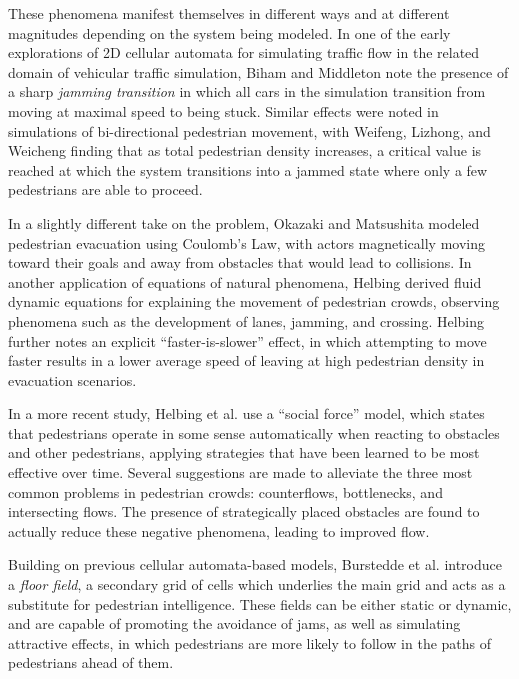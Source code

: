 \documentclass[12pt]{article}
\begin{document}
These phenomena manifest themselves in different ways and at different
magnitudes depending on the system being modeled. In one of the early
explorations of 2D cellular automata for simulating traffic flow in the related
domain of vehicular traffic simulation, Biham and Middleton \cite{biham1992self}
note the presence of a sharp
\textit{jamming transition} in which all cars in the simulation transition from
moving at maximal speed to being stuck. Similar effects were noted in
simulations of bi-directional pedestrian movement, with Weifeng, Lizhong, and
Weicheng \cite{weifeng2003simulation} finding that as total pedestrian density
increases, a critical value is reached at which the system transitions into a
jammed state where only a few pedestrians are able to proceed.

In a slightly different take on the problem, Okazaki and Matsushita
\cite{okazaki1993study} modeled pedestrian evacuation using Coulomb's Law, with
actors magnetically moving toward their goals and away from obstacles that would
lead to collisions. In another application of equations of natural phenomena,
Helbing \cite{helbing1998fluid} derived fluid dynamic equations for explaining
the movement of pedestrian crowds, observing phenomena such as the development
of lanes, jamming, and crossing. Helbing \cite{helbing2000simulating} further
notes an explicit ``faster-is-slower'' effect, in which attempting to move faster
results in a lower average speed of leaving at high pedestrian density in
evacuation scenarios.

In a more recent study, Helbing et al. \cite{helbing2005self} use a
``social force'' model, which states that pedestrians operate in some sense
automatically when reacting to obstacles and other pedestrians, applying
strategies that have been learned to be most effective over time. Several
suggestions are made to alleviate the three most common problems in pedestrian
crowds: counterflows, bottlenecks, and intersecting flows. The presence of
strategically placed obstacles are found to actually reduce these negative
phenomena, leading to improved flow.

Building on previous cellular automata-based models, Burstedde et al.
\cite{burstedde2001simulation} introduce a \textit{floor field}, a secondary
grid of cells which underlies the main grid and acts as a substitute for
pedestrian intelligence. These fields can be either static or dynamic, and are
capable of promoting the avoidance of jams, as well as simulating attractive
effects, in which pedestrians are more likely to follow in the paths of
pedestrians ahead of them.
\end{document}
